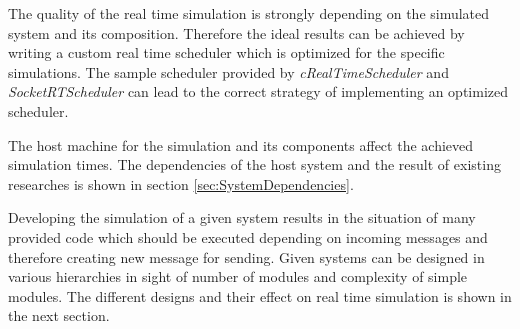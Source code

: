 The quality of the real time simulation is strongly depending on the simulated system and its composition.
Therefore the ideal results can be achieved by writing a custom real time scheduler which is optimized for the specific simulations.
The sample scheduler provided by \emph{cRealTimeScheduler} and \emph{SocketRTScheduler} can lead to the correct strategy of implementing an optimized scheduler.

The host machine for the simulation and its components affect the achieved simulation times.
The dependencies of the host system and the result of existing researches is shown in section \ref{sec:SystemDependencies}. %

Developing the simulation of a given system results in the situation of many provided code which should be executed depending on incoming messages and therefore creating new message for sending.
Given systems can be designed in various hierarchies in sight of number of modules and complexity of simple modules.
The different designs and their effect on real time simulation is shown in the next section.

